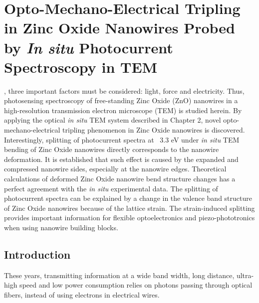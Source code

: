 

\chapter{Opto-Mechano-Electrical Tripling in Zinc Oxide Nanowires Probed by \emph{In situ} Photocurrent Spectroscopy in TEM}

, three important factors must be considered: light, force and electricity. 
Thus, photosensing spectroscopy of free-standing Zinc Oxide (ZnO) nanowires in a high-resolution transmission electron microscope (TEM) is studied herein. 
By applying the optical {\em in situ} TEM system described in Chapter 2, novel opto-mechano-electrical tripling phenomenon in Zinc Oxide nanowires is discovered. 
Interestingly, splitting of photocurrent spectra at ~3.3 eV under {\em in situ} TEM bending of Zinc Oxide nanowires directly corresponds to the nanowire deformation. It is established that such effect is caused by the expanded and compressed nanowire sides, especially at the nanowire edges. 
Theoretical calculations of deformed Zinc Oxide nanowire bend structure changes has a perfect agreement with the {\em in situ} experimental data. 
The splitting of photocurrent spectra can be explained by a change in the valence band structure of Zinc Oxide nanowires because of the lattice strain. 
The strain-induced splitting provides important information for flexible optoelectronics and piezo-phototronics when using nanowire building blocks. 

\section{Introduction}

These years, transmitting information at a wide band width, long distance, ultra-high speed and low power consumption relies on photons passing through optical fibers, instead of using electrons in electrical wires. 


